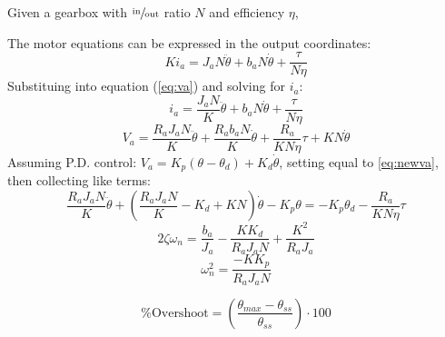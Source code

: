 \documentclass[12pt]{report}
\begin{document}
Given a gearbox with $\sfrac{\text{in}}{\text{out}}$ ratio $N$ and efficiency $\eta$,
\begin{center}
\end{center}
The motor equations can be expressed in the output coordinates:
\[
Ki_a = J_aN\ddot{\theta} + b_aN\dot{\theta} + \frac{\tau}{N\eta}
\]
Substituing into equation (\ref{eq:va}) and solving for $i_a$:
\[
  i_a = \frac{J_aN}{K}\ddot{\theta} + b_aN\dot{\theta} + \frac{\tau}{N\eta}
\]
\begin{equation}
  V_a = \frac{R_aJ_aN}{K}\ddot{\theta} + \frac{R_ab_aN}{K}\dot{\theta} + \frac{R_a}{KN\eta}\tau + KN\dot{\theta}
  \label{eq:newva}
\end{equation}
Assuming P.D. control: \(V_a = K_p(\theta-\theta_d) + K_d\dot{\theta}\), setting equal to \ref{eq:newva}, then collecting like terms:
\begin{equation}
  \frac{R_aJ_aN}{K}\ddot{\theta} + \left( \frac{R_aJ_aN}{K} - K_d + KN \right)\dot{\theta} - K_p\theta = -K_p\theta_d - \frac{R_a}{KN\eta}\tau
\end{equation}
\begin{equation}
  2\zeta\omega_n = \frac{b_a}{J_a} - \frac{KK_d}{R_aJ_aN} + \frac{K^2}{R_aJ_a}
\end{equation}
\begin{equation}
  \omega_n^2 = \frac{-KK_p}{R_aJ_aN}
\end{equation}

\begin{equation}
  \text{\% Overshoot} = \left( \frac{\theta_{max} - \theta_{ss}}{\theta_{ss}} \right) \cdot 100
\end{equation}
\end{document}
